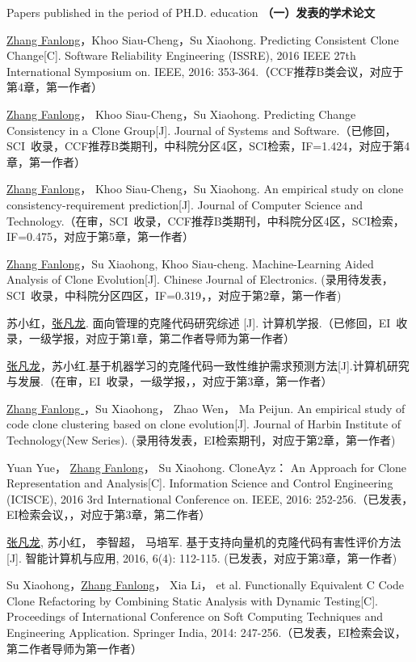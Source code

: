 
 {Papers
published in the period of PH.D. education}
\noindent\textbf{（一）发表的学术论文}
\begin{publist}
\item
\underline{Zhang Fanlong}，Khoo Siau-Cheng，Su Xiaohong. Predicting Consistent Clone Change[C]. Software Reliability Engineering (ISSRE), 2016 IEEE 27th International Symposium on. IEEE, 2016: 353-364.（CCF推荐B类会议，对应于第4章，第一作者）
\item
\underline{Zhang Fanlong}， Khoo Siau-Cheng，Su Xiaohong. Predicting Change Consistency in a Clone Group[J]. Journal of Systems and Software.（已修回，SCI~收录，CCF推荐B类期刊，中科院分区4区，SCI检索，IF=1.424，对应于第4章，第一作者）
\item
\underline{Zhang Fanlong}， Khoo Siau-Cheng，Su Xiaohong. An empirical study on clone consistency-requirement prediction[J]. Journal of Computer Science and Technology.（在审，SCI~收录，CCF推荐B类期刊，中科院分区4区，SCI检索，IF=0.475，对应于第5章，第一作者）
\item
\underline{Zhang Fanlong}，Su Xiaohong, Khoo Siau-cheng. Machine-Learning Aided Analysis of Clone Evolution[J]. Chinese Journal of Electronics. (录用待发表，SCI~收录，中科院分区四区，IF=0.319，，对应于第2章，第一作者)
\item 
苏小红，\underline{张凡龙}. 面向管理的克隆代码研究综述 [J]. 计算机学报.（已修回，EI~收录，一级学报，对应于第1章，第二作者导师为第一作者）
\item
\underline{张凡龙}，苏小红.基于机器学习的克隆代码一致性维护需求预测方法[J].计算机研究与发展.（在审，EI~收录，一级学报，，对应于第3章，第一作者）
\item
\underline{Zhang Fanlong }，Su Xiaohong， Zhao Wen， Ma Peijun. An empirical study of code clone clustering based on clone evolution[J]. Journal of Harbin Institute of Technology(New Series). (录用待发表，EI检索期刊，对应于第2章，第一作者)
\item
Yuan Yue， \underline{Zhang Fanlong}， Su Xiaohong. CloneAyz： An Approach for Clone Representation and Analysis[C]. Information Science and Control Engineering (ICISCE), 2016 3rd International Conference on. IEEE, 2016: 252-256.（已发表，EI检索会议，，对应于第3章，第二作者）
\item
\underline{张凡龙}, 苏小红， 李智超， 马培军. 基于支持向量机的克隆代码有害性评价方法[J]. 智能计算机与应用, 2016, 6(4): 112-115. (已发表，对应于第3章，第一作者)
\item
Su Xiaohong，\underline{Zhang Fanlong}， Xia Li， et al. Functionally Equivalent C Code Clone Refactoring by Combining Static Analysis with Dynamic Testing[C]. Proceedings of International Conference on Soft Computing Techniques and Engineering Application. Springer India, 2014: 247-256.（已发表，EI检索会议，第二作者导师为第一作者）
\end{publist}

